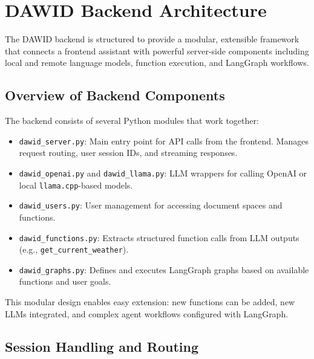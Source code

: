 %
\section{DAWID Backend Architecture}

The DAWID backend is structured to provide a modular, extensible framework that connects a frontend assistant with powerful server-side components including local and remote language models, function execution, and LangGraph workflows.

%
\subsection*{Overview of Backend Components}

The backend consists of several Python modules that work together:
\begin{itemize}
    \item \texttt{dawid\_server.py}: Main entry point for API calls from the frontend. Manages request routing, user session IDs, and streaming responses.
    \item \texttt{dawid\_openai.py} and \texttt{dawid\_llama.py}: LLM wrappers for calling OpenAI or local \texttt{llama.cpp}-based models.
		\item \texttt{dawid\_users.py}: User management for accessing document spaces and functions. 
    \item \texttt{dawid\_functions.py}: Extracts structured function calls from LLM outputs (e.g., \texttt{get\_current\_weather}).
    \item \texttt{dawid\_graphs.py}: Defines and executes LangGraph graphs based on available functions and user goals.
\end{itemize}

This modular design enables easy extension: new functions can be added, new LLMs integrated, and complex agent workflows configured with LangGraph.

%
\subsection*{Session Handling and Routing}

